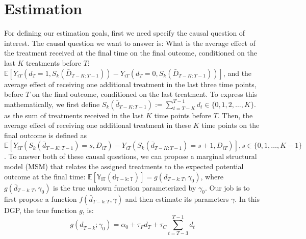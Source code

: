 \section{Estimation}
\label{estimation}
For defining our estimation goals, first we need specify the causal question of interest. The causal
question we want to answer is: What is the average effect of the treatment received at the final time on the 
final outcome, conditioned on the last $K$ treatments before $T$: 
$\mathbb{E}\left[ Y_{iT}\left(d_T = 1, S_k(\bar{D}_{T-K:T-1})\right) - Y_{iT}\left(d_T = 0, S_k(\bar{D}_{T-K:T-1})\right) \right]$, and the 
average effect of receiving one additional treatment in the last three time points, 
before $T$ on the final outcome, conditioned on  
the last treatment. To express 
this mathematically, we first define $S_k(\bar{d}_{T-K:T-1}) := \sum_{t=T-K}^{T-1} d_t \in \{0,1,2,\dots, K\}.$ as the sum 
of treatments received in the last $K$ time points before $T$. Then, the average effect of receiving one additional treatment 
in these $K$ time points on the final outcome is defined as 
$\mathbb{E}\left[Y_{iT}\left({S_k(\bar{d}_{T-K:T-1}) = s, D_{iT}}\right) - Y_{iT}\left({S_k(\bar{d}_{T-K:T-1}) = s+1, D_{iT}}\right)\right], s \in \{0,1,\dots,K-1\}$. 
To answer both of these causal questions, we can propose a marginal structural model (MSM) 
that relates the assigned treatments to the expected potential outcome at the final time: 
$\mathbb{E\left[Y_{iT}\left(\bar{d}_{T-k:T}\right)\right]} = g(\bar{d}_{T-k:T}, \gamma_0)$, where 
$g(\bar{d}_{T-k:T}, \gamma_0)$ is the true unkown function parameterized by $\gamma_0$. Our job is 
to first propose a function $f(\bar{d}_{T-k:T}, \gamma)$ and then estimate its parameters $\gamma$. In this 
DGP, the true function $g$, is: 
\begin{equation}
    \label{truemsm}
    g\left(\underline{d}_{T-k}; \gamma_0 \right) = \alpha_0 + \tau_{F} d_T + \tau_{C} \sum_{t=T-3}^{T-1} d_t
\end{equation}

